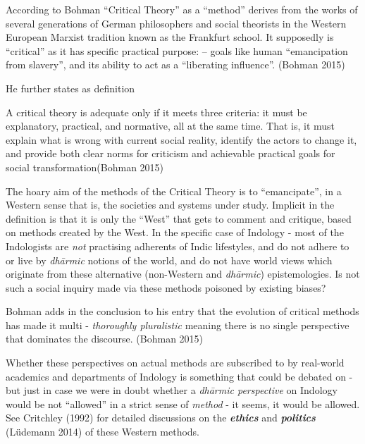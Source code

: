 According to Bohman ``Critical Theory'' as a ``method'' derives from the works of several generations of German philosophers and social theorists in the Western European Marxist tradition known as the Frankfurt school. It supposedly is ``critical'' as it has specific practical purpose: -- goals like human ``emancipation from slavery'', and its ability to act as a ``liberating influence''. (Bohman 2015)

He further states as definition
\begin{myquote}
A critical theory is adequate only if it meets three criteria: it must be explanatory, practical, and normative, all at the same time. That is, it must explain what is wrong with current social reality, identify the actors to change it, and provide both clear norms for criticism and achievable practical goals for social transformation\hfill (Bohman 2015)
\end{myquote}

\newpage

The hoary aim of the methods of the Critical Theory is to ``emancipate'', in a Western sense that is, the societies and systems under study. Implicit in the definition is that it is only the ``West'' that gets to comment and critique, based on methods created by the West. In the specific case of Indology - most of the Indologists are {\sl not} practising adherents of Indic lifestyles, and do not adhere to or live by {\sl dhārmic} notions of the world, and do not have world views which originate from these alternative (non-Western and {\sl dhārmic}) epistemologies. Is not such a social inquiry made via these methods poisoned by existing biases?

Bohman adds in the conclusion to his entry that the evolution of critical methods has made it multi - {\sl thoroughly pluralistic} meaning there is no single perspective that dominates the discourse. (Bohman 2015)

Whether these perspectives on actual methods are subscribed to by real-world  academics and departments of Indology is something that could be debated on - but just in case we were in doubt whether a {\sl dhārmic perspective} on Indology would be  not ``allowed'' in a strict sense of {\sl method} - it seems, it would be allowed. See Critchley (1992) for detailed discussions on the {{\sl\bfseries ethics}\relax} and {{\sl\bfseries politics}\relax} (Lüdemann 2014) of these Western methods.

